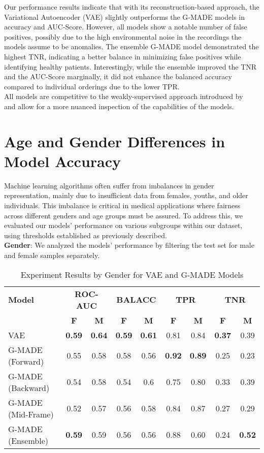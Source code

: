 Our performance results indicate that with its reconstruction-based approach, the Variational Autoencoder (VAE) slightly outperforms the G-MADE models in accuracy and AUC-Score. However, all models show a notable number of false positives, possibly due to the high environmental noise in the recordings the models assume to be anomalies. The ensemble G-MADE model demonstrated the highest TNR, indicating a better balance in minimizing false positives while identifying healthy patients. Interestingly, while the ensemble improved the TNR and the AUC-Score marginally, it did not enhance the balanced accuracy compared to individual orderings due to the lower TPR.\\
All models are competitive to the weakly-supervised approach introduced by~\cite{cozzatti2022variational} and allow for a more nuanced inspection of the capabilities of the models.
\section{Age and Gender Differences in Model Accuracy}
Machine learning algorithms often suffer from imbalances in gender representation, mainly due to insufficient data from females, youths, and older individuals. This imbalance is critical in medical applications where fairness across different genders and age groups must be assured. To address this, we evaluated our models' performance on various subgroups within our dataset, using thresholds established as previously described.\\
\textbf{Gender}: We analyzed the models' performance by filtering the test set for male and female samples separately.

\begin{table}[h!]
    \centering
    \caption{Experiment Results by Gender for VAE and G-MADE Models}
    \begin{tabular}{|l||c|c||c|c||c|c||c|c|}
    \hline
    \textbf{Model} & \multicolumn{2}{c||}{\textbf{ROC-AUC}} & \multicolumn{2}{c||}{\textbf{BALACC}} & \multicolumn{2}{c||}{\textbf{TPR}} & \multicolumn{2}{c|}{\textbf{TNR}} \\
    \cline{2-9}
    & \textbf{F} & \textbf{M} & \textbf{F} & \textbf{M} & \textbf{F} & \textbf{M} & \textbf{F} & \textbf{M} \\
    \hline
    VAE & \textbf{0.59} & \textbf{0.64} & \textbf{0.59} & \textbf{0.61} & 0.81 & 0.84 & \textbf{0.37} & 0.39 \\
    G-MADE (Forward) & 0.55 & 0.58 & 0.58 & 0.56 & \textbf{0.92} & \textbf{0.89} & 0.25 & 0.23 \\
    G-MADE (Backward) & 0.54 & 0.58 & 0.54 & 0.6 & 0.75 & 0.80 & 0.33 & 0.39 \\
    G-MADE (Mid-Frame) & 0.52 & 0.57 & 0.56 & 0.58 & 0.84 & 0.87 & 0.27 & 0.29 \\
    G-MADE (Ensemble) & \textbf{0.59} & 0.59 & 0.56 & 0.56 & 0.88 & 0.60 & 0.24 & \textbf{0.52} \\
    \hline
    \end{tabular}
\end{table}

